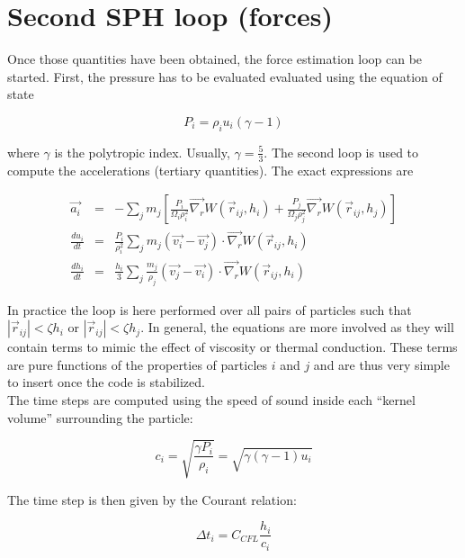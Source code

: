 \documentclass[a4paper,10pt]{article}
\begin{document}
\section{Second SPH loop (forces)}

Once those quantities have been obtained, the force estimation loop can be started.
First, the pressure has to be evaluated evaluated using the equation of state

\begin{equation}
 P_i = \rho_i u_i (\gamma - 1)
\end{equation}

where $\gamma$ is the polytropic index. Usually, $\gamma = \frac{5}{3}$.
The second loop is used to compute the accelerations (tertiary quantities). The exact expressions are

\begin{eqnarray}
 \vec{a_i} &=& - \sum_j m_j\left[\frac{P_i}{\Omega_i\rho_i^2}\vec{\nabla_r} W(\vec{r}_{ij}, h_i) +
\frac{P_j}{\Omega_j\rho_j^2}\vec{\nabla_r}W(\vec{r}_{ij}, h_j) \right] \label{eq:acceleration}\\
 \frac{du_i}{dt} &=& \frac{P_i}{\rho_i^2} \sum_j m_j (\vec{v_i}-\vec{v_j})\cdot\vec{\nabla_r} W(\vec{r}_{ij}, h_i)
\label{eq:dudt}\\
 \frac{dh_i}{dt} &=& \frac{h_i}{3}\sum_j \frac{m_j}{\rho_j} \left(\vec{v_j} - \vec{v_i} \right)
\cdot\vec{\nabla_r}W(\vec{r}_{ij},
h_i)
\end{eqnarray}

In practice the loop is here performed over all pairs of particles such that $|\vec{r}_{ij}| < \zeta h_i$ or
$|\vec{r}_{ij}| < \zeta
h_j$. In general, the equations are more involved as they will contain terms to mimic the effect of viscosity or
thermal conduction. These terms are pure functions of the properties of particles $i$ and $j$ and are thus very simple
to insert once the code is stabilized.\\

The time steps are computed using the speed of sound inside each ``kernel volume'' surrounding the particle:

\begin{equation}
 c_i = \sqrt{\frac{\gamma P_i}{\rho_i}} = \sqrt{\gamma (\gamma-1)u_i}
\end{equation}

The time step is then given by the Courant relation:

\begin{equation}
 \Delta t_i = C_{CFL} \frac{h_i}{c_i}
\end{equation}
\end{document}

